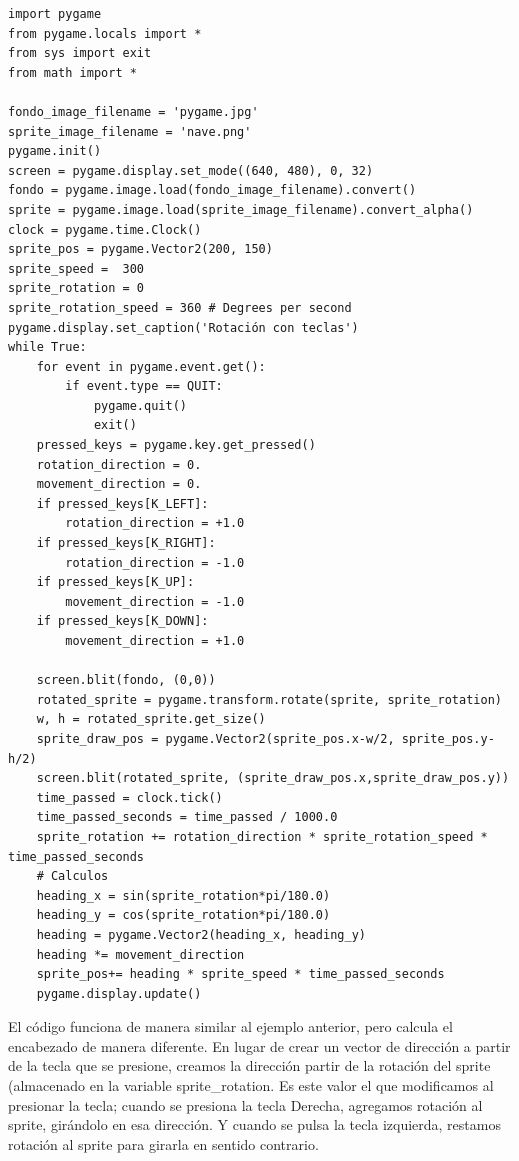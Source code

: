{ 
\hspace{-2.5cm}{\ttfamily \scriptsize movimiento}

\vspace{-0.2cm}
\hspace{-2.5cm}{\ttfamily \scriptsize \_rotacion.py}\vspace{-0.84cm}
\begin{lstlisting}
import pygame
from pygame.locals import *
from sys import exit
from math import *

fondo_image_filename = 'pygame.jpg'
sprite_image_filename = 'nave.png'
pygame.init()
screen = pygame.display.set_mode((640, 480), 0, 32)
fondo = pygame.image.load(fondo_image_filename).convert()
sprite = pygame.image.load(sprite_image_filename).convert_alpha()
clock = pygame.time.Clock()
sprite_pos = pygame.Vector2(200, 150)
sprite_speed =  300
sprite_rotation = 0
sprite_rotation_speed = 360 # Degrees per second
pygame.display.set_caption('Rotación con teclas')
while True:
    for event in pygame.event.get():
        if event.type == QUIT:
            pygame.quit()
            exit()
    pressed_keys = pygame.key.get_pressed()
    rotation_direction = 0.
    movement_direction = 0.
    if pressed_keys[K_LEFT]:
        rotation_direction = +1.0
    if pressed_keys[K_RIGHT]:
        rotation_direction = -1.0
    if pressed_keys[K_UP]:
        movement_direction = -1.0
    if pressed_keys[K_DOWN]:
        movement_direction = +1.0
   
    screen.blit(fondo, (0,0))
    rotated_sprite = pygame.transform.rotate(sprite, sprite_rotation)
    w, h = rotated_sprite.get_size()
    sprite_draw_pos = pygame.Vector2(sprite_pos.x-w/2, sprite_pos.y-h/2)
    screen.blit(rotated_sprite, (sprite_draw_pos.x,sprite_draw_pos.y))
    time_passed = clock.tick()
    time_passed_seconds = time_passed / 1000.0
    sprite_rotation += rotation_direction * sprite_rotation_speed * time_passed_seconds
    # Calculos
    heading_x = sin(sprite_rotation*pi/180.0)
    heading_y = cos(sprite_rotation*pi/180.0)
    heading = pygame.Vector2(heading_x, heading_y)
    heading *= movement_direction
    sprite_pos+= heading * sprite_speed * time_passed_seconds
    pygame.display.update()
\end{lstlisting}	

El código funciona de manera similar al ejemplo anterior, pero calcula el encabezado de manera diferente.
En lugar de crear un vector de dirección  a partir de la tecla que se presione, creamos la dirección  partir de la 
rotación del sprite (almacenado en la variable  {\ttfamily sprite\_rotation}. Es este valor el que modificamos al presionar la tecla;
cuando se presiona la tecla Derecha, agregamos rotación al sprite, girándolo en esa dirección. Y cuando  se pulsa la tecla izquierda, restamos  rotación al sprite para girarla en sentido contrario.

}
